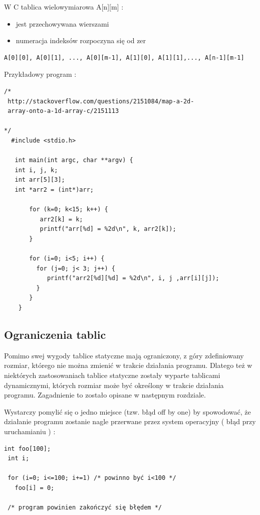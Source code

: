 \documentclass[a4paper,12pt]{article}
\begin{document}
W C tablica wielowymiarowa A[n][m] :
\begin{itemize}
\item{jest przechowywana wierszami}
\item{numeracja indeksów rozpoczyna się od zer}
\end{itemize}
   
   \begin{lstlisting}[caption=Tablica, captionpos=t, label=src:sqrt, frame=lBTr, frameround=ffff, captionpos=b ]
 A[0][0], A[0][1], ..., A[0][m-1], A[1][0], A[1][1],..., A[n-1][m-1] 
\end{lstlisting}

Przykładowy program :

\begin{lstlisting}[caption=Kod, captionpos=t, label=src:sqrt, frame=lBTr, frameround=ffff, captionpos=b ]
/*
 http://stackoverflow.com/questions/2151084/map-a-2d-
 array-onto-a-1d-array-c/2151113

*/
  #include <stdio.h>

   int main(int argc, char **argv) {
   int i, j, k;
   int arr[5][3];
   int *arr2 = (int*)arr;

       for (k=0; k<15; k++) {
          arr2[k] = k;
          printf("arr[%d] = %2d\n", k, arr2[k]);
       }

       for (i=0; i<5; i++) {
         for (j=0; j< 3; j++) {
            printf("arr2[%d][%d] = %2d\n", i, j ,arr[i][j]);
         }
       } 
    }
\end{lstlisting}


\subsection*{Ograniczenia tablic}
Pomimo swej wygody tablice statyczne mają ograniczony, z góry zdefiniowany rozmiar, którego nie można zmienić w trakcie działania programu. Dlatego też w niektórych zastosowaniach tablice statyczne zostały wyparte tablicami dynamicznymi, których rozmiar może być określony w trakcie działania programu. Zagadnienie to zostało opisane w następnym rozdziale.

Wystarczy pomylić się o jedno miejsce (tzw. błąd off by one) by spowodować, że działanie programu zostanie nagle przerwane przez system operacyjny ( błąd przy uruchamianiu ) :


\begin{lstlisting}[caption=Bład, captionpos=t, label=src:sqrt, frame=lBTr, frameround=ffff, captionpos=b ]
 int foo[100];
 int i;
 
 for (i=0; i<=100; i+=1) /* powinno być i<100 */
   foo[i] = 0;

 /* program powinien zakończyć się błędem */
\end{lstlisting}
\end{document}
